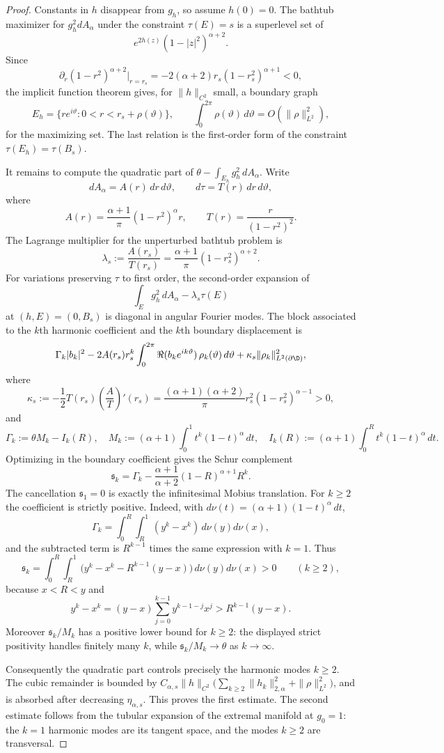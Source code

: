 \begin{proof}
Constants in $h$ disappear from $g_h$, so assume $h(0)=0$. The bathtub
maximizer for $g_h^2dA_\alpha$ under the constraint $\tau(E)=s$ is a superlevel
set of
\[
e^{2h(z)}(1-|z|^2)^{\alpha+2}.
\]
Since
\[
\partial_r(1-r^2)^{\alpha+2}\big|_{r=r_s}
=-2(\alpha+2)r_s(1-r_s^2)^{\alpha+1}<0,
\]
the implicit function theorem gives, for $\|h\|_{C^2}$ small, a boundary graph
\[
E_h=\{re^{i\vartheta}:0<r<r_s+\rho(\vartheta)\},
\qquad
\int_0^{2\pi}\rho(\vartheta)\,d\vartheta=O(\|\rho\|_{L^2}^2),
\]
for the maximizing set. The last relation is the first-order form of the
constraint $\tau(E_h)=\tau(B_s)$.

It remains to compute the quadratic part of
$\theta-\int_{E_h}g_h^2\,dA_\alpha$. Write
\[
dA_\alpha=A(r)\,dr\,d\vartheta,\qquad
d\tau=T(r)\,dr\,d\vartheta,
\]
where
\[
A(r)=\frac{\alpha+1}{\pi}(1-r^2)^\alpha r,
\qquad
T(r)=\frac{r}{(1-r^2)^2}.
\]
The Lagrange multiplier for the unperturbed bathtub problem is
\[
\lambda_s:=\frac{A(r_s)}{T(r_s)}
=\frac{\alpha+1}{\pi}(1-r_s^2)^{\alpha+2}.
\]
For variations preserving $\tau$ to first order, the second-order expansion of
\[
\int_E g_h^2\,dA_\alpha-\lambda_s\tau(E)
\]
at $(h,E)=(0,B_s)$ is diagonal in angular Fourier modes. The block associated
to the $k$th harmonic coefficient and the $k$th boundary displacement is
\[
\Gamma_k |b_k|^2
-2A(r_s)r_s^k
\int_0^{2\pi}\Re(b_ke^{ik\vartheta})\,\rho_k(\vartheta)\,d\vartheta
+\kappa_s\|\rho_k\|_{L^2(\partial\D)}^2,
\]
where
\[
\kappa_s
:=
-\frac12 T(r_s)\left(\frac{A}{T}\right)'(r_s)
=
\frac{(\alpha+1)(\alpha+2)}{\pi}
r_s^2(1-r_s^2)^{\alpha-1}>0,
\]
and
\[
\Gamma_k
:=
\theta M_k-I_k(R),
\quad
M_k:=(\alpha+1)\int_0^1 t^k(1-t)^\alpha\,dt,
\quad
I_k(R):=(\alpha+1)\int_0^R t^k(1-t)^\alpha\,dt .
\]
Optimizing in the boundary coefficient gives the Schur complement
\[
\mathfrak s_k
=
\Gamma_k
-
\frac{\alpha+1}{\alpha+2}(1-R)^{\alpha+1}R^k .
\]
The cancellation $\mathfrak s_1=0$ is exactly the infinitesimal Mobius
translation. For $k\ge2$ the coefficient is strictly positive. Indeed, with
$d\nu(t)=(\alpha+1)(1-t)^\alpha\,dt$,
\[
\Gamma_k
=
\int_0^R\int_R^1 (y^k-x^k)\,d\nu(y)d\nu(x),
\]
and the subtracted term is $R^{k-1}$ times the same expression with $k=1$.
Thus
\[
\mathfrak s_k
=
\int_0^R\int_R^1
\bigl(y^k-x^k-R^{k-1}(y-x)\bigr)\,d\nu(y)d\nu(x)>0
\qquad (k\ge2),
\]
because $x<R<y$ and
\[
y^k-x^k=(y-x)\sum_{j=0}^{k-1}y^{k-1-j}x^j
>R^{k-1}(y-x).
\]
Moreover $\mathfrak s_k/M_k$ has a positive lower bound for $k\ge2$: the
displayed strict positivity handles finitely many $k$, while
$\mathfrak s_k/M_k\to\theta$ as $k\to\infty$.

Consequently the quadratic part controls precisely the harmonic modes
$k\ge2$. The cubic remainder is bounded by
$C_{\alpha,s}\|h\|_{C^2}\bigl(\sum_{k\ge2}\|h_k\|_{2,\alpha}^2+
\|\rho\|_{L^2}^2\bigr)$, and is absorbed after decreasing
$\eta_{\alpha,s}$. This proves the first estimate. The second estimate follows
from the tubular expansion of the extremal manifold at $g_0=1$:
the $k=1$ harmonic modes are its tangent space, and the modes $k\ge2$ are
transversal.
\end{proof}
